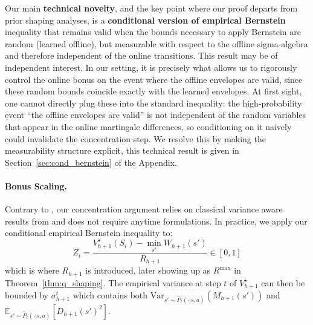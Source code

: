 \documentclass[twoside]{article}
\newcommand{\lowv}{W} %
\begin{document}
Our main \textbf{technical novelty}, and the key point where our proof departs from prior shaping analyses, is a \textbf{conditional version of empirical Bernstein} inequality that remains valid when the bounds necessary to apply Bernstein \cite{maurer_empirical_2009} are random (learned offline), but measurable with respect to the offline sigma-algebra and therefore independent of the online transitions. This result may be of independent interest. In our setting, it is precisely what allows us to rigorously control the online bonus on the event where the offline envelopes are valid, since these random bounds coincide exactly with the learned envelopes. At first sight, one cannot directly plug these into the standard inequality: the high-probability event “the offline envelopes are valid” is not independent of the random variables that appear in the online martingale differences, 
so conditioning on it naively could invalidate the concentration step. We resolve this by making the measurability structure explicit, this technical result is given in Section~\ref{sec:cond_bernstein} of the Appendix.


\paragraph{Bonus Scaling.} Contrary to \cite{gupta_unpacking_2022}, our concentration argument relies on classical variance aware results from \cite{maurer_empirical_2009} and does not require anytime formulations. In practice, we apply our conditional empirical Bernstein inequality to:
 \[Z_i = \frac{V_{h+1}^{\star}(S_i) - \min_{s'} \lowv_{h+1}(s')}{R_{h+1}} \in [0,1]\]
 which is where $R_{h+1}$ is introduced, later showing up as $R^{\max}$ in Theorem~\ref{thm:q_shaping}. The empirical variance at step $t$ of $V^{\star}_{h+1}$ can then be bounded by $\sigma^t_{h+1}$ which contains both $\mathrm{Var}_{s'\sim\widehat{P}_t(\cdot|s,a)} (M_{h+1}(s') )$ and $\mathbb{E}_{s'\sim\widehat{P}_t(\cdot|s,a)} [D_{h+1}(s')^2 ]$.
 
\end{document}
